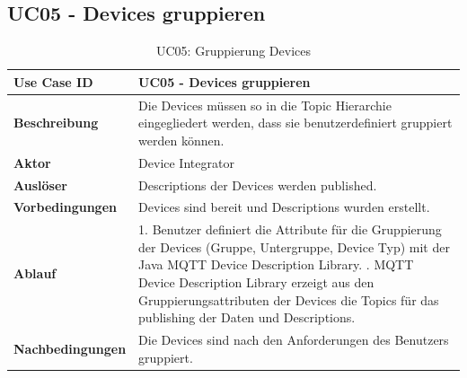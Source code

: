 \subsection{UC05 - Devices gruppieren}

\begin{table}[H]
\begin{tabularx}{\textwidth}{|l|X|}

 \hline
 {\bf Use Case ID }    & UC05 - Devices gruppieren \\  \hline
 {\bf Beschreibung }   & Die Devices müssen so in die Topic Hierarchie eingegliedert werden, dass sie benutzerdefiniert gruppiert werden können. \\ \hline
 {\bf Aktor }          & Device Integrator \\ \hline
 {\bf Auslöser }       & Descriptions der Devices werden published. \\ \hline
 {\bf Vorbedingungen } & Devices sind bereit und Descriptions wurden erstellt. \\ \hline
 {\bf Ablauf }         & 
  1. Benutzer definiert die Attribute für die Gruppierung der Devices (Gruppe, Untergruppe, Device Typ) mit der Java MQTT Device Description Library. \newline
  2. MQTT Device Description Library erzeigt aus den Gruppierungsattributen der Devices die Topics für das publishing der Daten und Descriptions. \\ \hline
 {\bf Nachbedingungen} & Die Devices sind nach den Anforderungen des Benutzers gruppiert. \\ \hline
  
\end{tabularx}
\caption{UC05: Gruppierung Devices}
\end{table}

